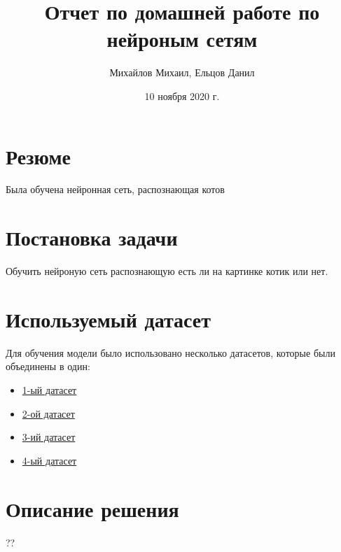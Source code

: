 \documentclass{article}
\title{Отчет по домашней работе по нейроным сетям}
\author{Михайлов Михаил, Ельцов Данил}
\date{10 ноября 2020 г.}
\begin{document}
\maketitle
\tableofcontents

\section*{Резюме}
Была обучена нейронная сеть, распознающая котов
\newpage
\section{Постановка задачи}
Обучить нейроную сеть распознающую есть ли на картинке котик или нет.

\section{Используемый датасет}
Для обучения модели было использовано несколько датасетов, которые были объединены в один:

\begin{itemize}
    \item \href{https://storage.googleapis.com/openimages/web/extended.html}{1-ый датасет}
    \item \href{https://www.kaggle.com/alessiocorrado99/animals10}{2-ой датасет}
    \item \href{https://www.kaggle.com/zippyz/cats-and-dogs-breeds-classification-oxford-dataset}{3-ий датасет}
    \item \href{https://www.kaggle.com/crawford/cat-dataset}{4-ый датасет}
\end{itemize}

\section{Описание решения}
??
\end{document}
